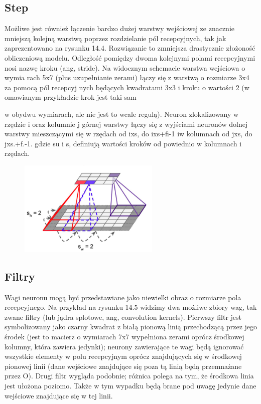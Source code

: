 \documentclass{article}
\begin{document}
\subsection{Step}
Możliwe jest również łączenie bardzo dużej warstwy wejściowej ze znacznie mniejszą kolejną warstwą poprzez rozdzielanie pól recepcyjnych, tak jak zaprezentowano na rysunku 14.4. Rozwiązanie to zmniejsza drastycznie złożoność obliczeniową modelu. Odległość pomiędzy dwoma kolejnymi polami recepcyjnymi nosi nazwę kroku (ang, stride). Na widocznym schemacie warstwa wejściowa o wymia rach 5x7 (plus uzupełnianie zerami) łączy się z warstwą o rozmiarze 3x4 za pomocą pól recepcyj nych będących kwadratami 3x3 i kroku o wartości 2 (w omawianym przykładzie krok jest taki sam \cite{geron}

w obydwu wymiarach, ale nie jest to wcale regulą). Neuron zlokalizowany w rzędzie i oraz kolumnie j górnej warstwy łączy się z wyjściami neuronów dolnej warstwy mieszczącymi się w rzędach od ixs, do ixs+fi-1 iw kolumnach od jxs, do jxs.+f.-1. gdzie su i s, definiują wartości kroków od powiednio w kolumnach i rzędach. \cite{geron}
\begin{figure}[H]
	\centering
	\includegraphics[width=0.6\textwidth,keepaspectratio=true]{step}
	\caption{}
\end{figure}
\subsection{Filtry}
Wagi neuronu mogą być przedstawiane jako niewielki obraz o rozmiarze pola recepcyjnego. Na przykład na rysunku 14.5 widzimy dwa możliwe zbiory wag, tak zwane filtry (lub jądra splotowe, ang, convolution kernels). Pierwszy filtr jest symbolizowany jako czarny kwadrat z białą pionową linią przechodzącą przez jego środek (jest to macierz o wymiarach 7x7 wypełniona zerami oprócz środkowej kolumny, która zawiera jedynki); neurony zawierające te wagi będą ignorować wszystkie elementy w polu recepcyjnym oprócz znajdujących się w środkowej pionowej linii (dane wejściowe znajdujące się poza tą linią będą przemnażane przez O). Drugi filtr wygląda podobnie; różnica polega na tym, że środkowa linia jest ułożona poziomo. Także w tym wypadku będą brane pod uwagę jedynie dane wejściowe znajdujące się w tej linii. \cite{geron}
\end{document}
